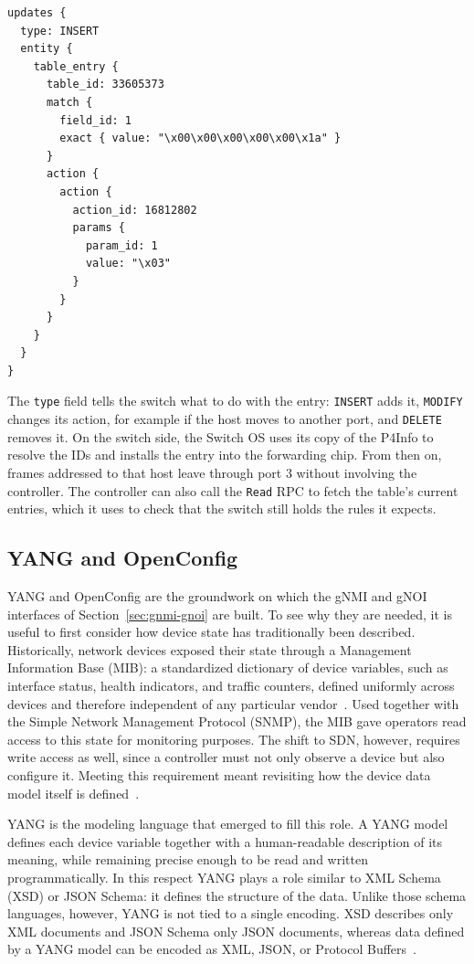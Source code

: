 \begin{lstlisting}[language={},caption={The resulting P4Runtime \texttt{Write} request (simplified).},label={lst:write-request}]
updates {
  type: INSERT
  entity {
    table_entry {
      table_id: 33605373
      match {
        field_id: 1
        exact { value: "\x00\x00\x00\x00\x00\x1a" }
      }
      action {
        action {
          action_id: 16812802
          params {
            param_id: 1
            value: "\x03"
          }
        }
      }
    }
  }
}
\end{lstlisting}

The \texttt{type} field tells the switch what to do with the entry: \texttt{INSERT} adds it, \texttt{MODIFY} changes its action, for example if the host moves to another port, and \texttt{DELETE} removes it. On the switch side, the Switch OS uses its copy of the P4Info to resolve the IDs and installs the entry into the forwarding chip. From then on, frames addressed to that host leave through port 3 without involving the controller. The controller can also call the \texttt{Read} RPC to fetch the table's current entries, which it uses to check that the switch still holds the rules it expects.

\subsection{YANG and OpenConfig}\label{sec:yang-openconfig}
YANG and OpenConfig are the groundwork on which the gNMI and gNOI interfaces of Section~\ref{sec:gnmi-gnoi} are built. To see why they are needed, it is useful to first consider how device state has traditionally been described. Historically, network devices exposed their state through a Management Information Base (MIB): a standardized dictionary of device variables, such as interface status, health indicators, and traffic counters, defined uniformly across devices and therefore independent of any particular vendor~\cite{systemsapproach}. Used together with the Simple Network Management Protocol (SNMP), the MIB gave operators read access to this state for monitoring purposes. The shift to SDN, however, requires write access as well, since a controller must not only observe a device but also configure it. Meeting this requirement meant revisiting how the device data model itself is defined~\cite{systemsapproach}.

YANG is the modeling language that emerged to fill this role. A YANG model defines each device variable together with a human-readable description of its meaning, while remaining precise enough to be read and written programmatically. In this respect YANG plays a role similar to XML Schema (XSD) or JSON Schema: it defines the structure of the data. Unlike those schema languages, however, YANG is not tied to a single encoding. XSD describes only XML documents and JSON Schema only JSON documents, whereas data defined by a YANG model can be encoded as XML, JSON, or Protocol Buffers~\cite{systemsapproach}.

